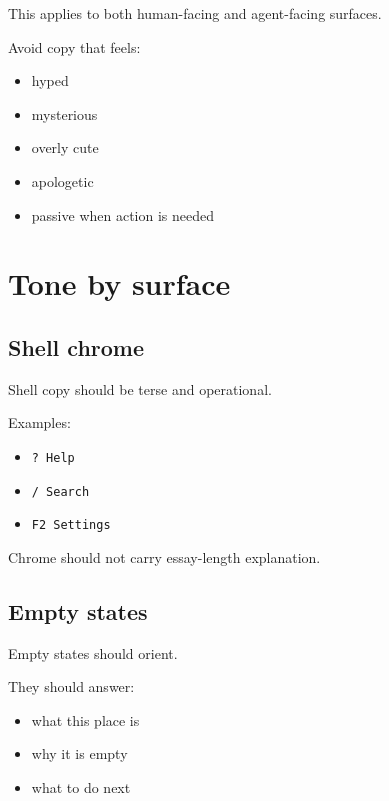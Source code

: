 This applies to both human-facing and agent-facing surfaces.

Avoid copy that feels:

\begin{itemize}
\tightlist
\item
  hyped
\item
  mysterious
\item
  overly cute
\item
  apologetic
\item
  passive when action is needed
\end{itemize}

\section{Tone by surface}\label{record-040-tone-by-surface}

\subsection{Shell chrome}\label{record-040-shell-chrome}

Shell copy should be terse and operational.

Examples:

\begin{itemize}
\tightlist
\item
  \texttt{?\allowbreak{} \allowbreak{}H\allowbreak{}e\allowbreak{}l\allowbreak{}p}
\item
  \texttt{/\allowbreak{} \allowbreak{}S\allowbreak{}e\allowbreak{}a\allowbreak{}r\allowbreak{}c\allowbreak{}h}
\item
  \texttt{F\allowbreak{}2\allowbreak{} \allowbreak{}S\allowbreak{}e\allowbreak{}t\allowbreak{}t\allowbreak{}i\allowbreak{}n\allowbreak{}g\allowbreak{}s}
\end{itemize}

Chrome should not carry essay-length explanation.

\subsection{Empty states}\label{record-040-empty-states}

Empty states should orient.

They should answer:

\begin{itemize}
\tightlist
\item
  what this place is
\item
  why it is empty
\item
  what to do next
\end{itemize}

